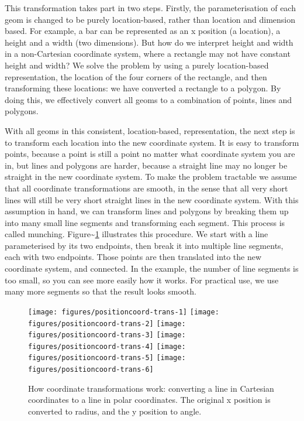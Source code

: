 This transformation takes part in two steps. Firstly, the
parameterisation of each geom is changed to be purely location-based,
rather than location and dimension based. For example, a bar can be
represented as an x position (a location), a height and a width (two
dimensions). But how do we interpret height and width in a non-Cartesian
coordinate system, where a rectangle may not have constant height and
width? We solve the problem by using a purely location-based
representation, the location of the four corners of the rectangle, and
then transforming these locations: we have converted a rectangle to a
polygon. By doing this, we effectively convert all geoms to a
combination of points, lines and polygons.
 

With all geoms in this consistent, location-based, representation, the
next step is to transform each location into the new coordinate system.
It is easy to transform points, because a point is still a point no
matter what coordinate system you are in, but lines and polygons are
harder, because a straight line may no longer be straight in the new
coordinate system. To make the problem tractable we assume that all
coordinate transformations are smooth, in the sense that all very short
lines will still be very short straight lines in the new coordinate
system. With this assumption in hand, we can transform lines and
polygons by breaking them up into many small line segments and
transforming each segment. This process is called munching.
 Figure\textasciitilde{}\ref{fig:coord-trans}
illustrates this procedure. We start with a line parameterised by its
two endpoints, then break it into multiple line segments, each with two
endpoints. Those points are then translated into the new coordinate
system, and connected. In the example, the number of line segments is
too small, so you can see more easily how it works. For practical use,
we use many more segments so that the result looks smooth.

\begin{figure}
\texttt{[image: figures/positioncoord-trans-1]} \texttt{[image: figures/positioncoord-trans-2]} \texttt{[image: figures/positioncoord-trans-3]} \texttt{[image: figures/positioncoord-trans-4]} \texttt{[image: figures/positioncoord-trans-5]} \texttt{[image: figures/positioncoord-trans-6]} \caption{How coordinate transformations work: converting a line in Cartesian coordinates to a line in polar coordinates.  The original x position is converted to radius, and the y position to angle.\label{fig:coord-trans}}
\end{figure}

